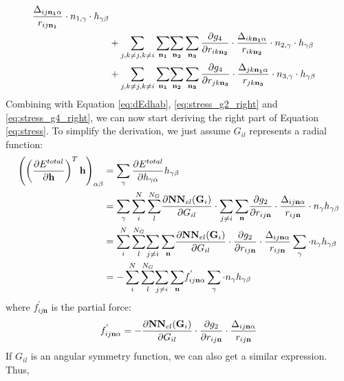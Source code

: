 \documentclass[preprint]{revtex4-2}
\begin{document}
{\begin{align}
{{{\frac{\Delta_{ij\mathbf{n_1}\alpha}}{r_{ij\mathbf{n_1}}} \cdot n_{1,\gamma} \cdot h_{\gamma\beta}}}} \nonumber \\
& + \sum_{j, k \neq j, k \neq i}{
    \sum_{\mathbf{n_1}}}{\sum_{\mathbf{n_2}}{\sum_{\mathbf{n_3}}{
\frac{\partial g_4}{\partial r_{ik\mathbf{n_2}}} \cdot 
\frac{\Delta_{ik\mathbf{n_1}\alpha}}{r_{ik\mathbf{n_2}}} \cdot n_{2,\gamma} \cdot h_{\gamma\beta}
}}} \nonumber \\
& + \sum_{j, k \neq j, k \neq i}{
    \sum_{\mathbf{n_1}}}{\sum_{\mathbf{n_2}}{\sum_{\mathbf{n_3}}{
\frac{\partial g_4}{\partial r_{jk\mathbf{n_3}}} \cdot 
\frac{\Delta_{jk\mathbf{n_1}\alpha}}{r_{jk\mathbf{n_3}}} \cdot n_{3,\gamma} \cdot h_{\gamma\beta}
}}}
\end{align}
Combining with Equation \ref{eq:dEdhab}, \ref{eq:stress_g2_right} and 
\ref{eq:stress_g4_right}, we can now start deriving the right part of Equation 
\ref{eq:stress}. To simplify the derivation, we just assume $G_{il}$ represents
a radial function:
\newcommand{\dE}{\partial{E^{total}}}
\begin{align}
\label{eq:dEdhTh_g2_expanded}
\left(
    \left(\frac{\partial E^{total}}{\partial \mathbf{h}}\right)^T \mathbf{h}
\right)_{\alpha\beta} & = 
\sum_{\gamma}{\frac{\dE}{\partial \hga} \hgb} \nonumber \\
& = \sum_{\gamma}{\sum_{i}^{N}{\sum_{l}^{N_G}}{
    \frac{\partial \mathbf{NN}_{el}(\mathbf{G}_i)}{\partial G_{il}}
    \cdot
    \sum_{j \neq i}{\sum_{\mathbf{n}}}{
    \frac{\partial g_2}{\partial \rijn} 
    \cdot 
    \frac{\Delta_{ij\mathbf{n}\alpha}}{\rijn} \cdot n_{\gamma}} \hgb
}} \nonumber \\
& = \sum_{i}^{N}{\sum_{l}^{N_G}}{\sum_{j \neq i}{\sum_{\mathbf{n}}}{
    \frac{\partial \mathbf{NN}_{el}(\mathbf{G}_i)}{\partial G_{il}}
    \cdot
    \frac{\partial g_2}{\partial \rijn} 
    \cdot 
    \frac{\Delta_{ij\mathbf{n}\alpha}}{\rijn}}
    \sum_{\gamma}{\cdot n_{\gamma}\hgb}
} \nonumber \\
& = -\sum_{i}^{N}{\sum_{l}^{N_G}}{\sum_{j \neq i}{\sum_{\mathbf{n}}}{
    f^{'}_{ij\mathbf{n}\alpha}
    \sum_{\gamma}{\cdot n_{\gamma}\hgb}
}}
\end{align}
where $f^{'}_{ij\mathbf{n}}$ is the partial force:
\begin{equation}
f^{'}_{ij\mathbf{n}\alpha} = 
-\frac{\partial \mathbf{NN}_{el}(\mathbf{G}_i)}{\partial G_{il}} \cdot 
\frac{\partial g_2}{\partial r_{ij\mathbf{n}}} \cdot 
\frac{\Delta_{ij\mathbf{n}\alpha}}{r_{ij\mathbf{n}}}
\end{equation}
If $G_{il}$ is an angular symmetry function, we can also get a similar 
expression. Thus,
\begin{equation}

\end{equation}}
\end{document}
